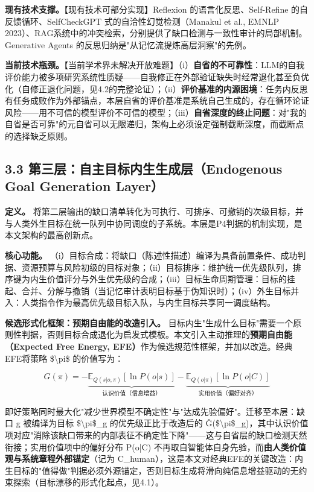 \documentclass[11pt,a4paper]{ctexart}
\begin{document}
\textbf{现有技术支撑。}【现有技术可部分实现】Reflexion 的语言化反思、Self-Refine 的自反馈循环、SelfCheckGPT 式的自洽性幻觉检测（Manakul et al., EMNLP 2023）、RAG系统中的冲突检索，分别提供了缺口检测与一致性审计的局部机制。Generative Agents 的反思归纳是"从记忆流提炼高层洞察"的先例。

\textbf{当前技术瓶颈。}【当前学术界未解决开放难题】（i）\textbf{自省的不可靠性}：LLM的自我评价能力被多项研究系统性质疑——自我修正在外部验证缺失时经常退化甚至负优化（自修正退化问题，见4.2的完整论证）；（ii）\textbf{评价基准的内源困境}：任务内反思有任务成败作为外部锚点，本层自省的评价基准是系统自己生成的，存在循环论证风险——用不可信的模型评价不可信的模型；（iii）\textbf{自省深度的终止问题}：对"我的自省是否可靠"的元自省可以无限递归，架构上必须设定强制截断深度，而截断点的选择缺乏原则。

\subsection{3.3 第三层：自主目标内生生成层（Endogenous Goal Generation Layer）}

\textbf{定义。} 将第二层输出的缺口清单转化为可执行、可排序、可撤销的次级目标，并与人类外生目标在统一队列中协同调度的子系统。本层是P4判据的机制实现，是本文架构的最高创新点。

\textbf{核心功能。} （i）目标合成：将缺口（陈述性描述）编译为具备前置条件、成功判据、资源预算与风险初级的目标对象；（ii）目标排序：维护统一优先级队列，排序键为内生价值评分与外生优先级的合成；（iii）目标生命周期管理：目标的挂起、合并、分解与撤销（当记忆审计表明目标基于伪知识时）；（iv）外生目标并入：人类指令作为最高优先级目标入队，与内生目标共享同一调度结构。

\textbf{候选形式化框架：预期自由能的改造引入。} 目标内生"生成什么目标"需要一个原则性判据，否则目标合成退化为启发式模板。本文引入主动推理的\textbf{预期自由能（Expected Free Energy, EFE）}作为候选规范性框架，并加以改造。经典EFE将策略 \$\textbackslash{}pi\$ 的价值写为：

\[G(\pi) = -\underbrace{\mathbb{E}_{Q(s|o,\pi)}[\ln P(o|s)]}_{\text{认识价值（信息增益）}} - \underbrace{\mathbb{E}_{Q(o|\pi)}[\ln P(o|C)]}_{\text{实用价值（偏好对齐）}}\]

即好策略同时最大化"减少世界模型不确定性"与"达成先验偏好"。迁移至本层：缺口 g 被编译为目标 \$\textbackslash{}pi\$\_g 的优先级正比于改造后的 Ĝ(\$\textbackslash{}pi\$\_g)，其中认识价值项对应"消除该缺口带来的内部表征不确定性下降"——这与自省层的缺口检测天然衔接；实用价值项中的偏好分布 P(o|C) 不再取自智能体自身先验，而\textbf{由人类价值观与系统章程外部锚定}（记为 C\_human），这是本文对经典EFE的关键改造：内生目标的"值得做"判据必须外源锚定，否则目标生成将滑向纯信息增益驱动的无约束探索（目标漂移的形式化起点，见4.1）。
\end{document}
